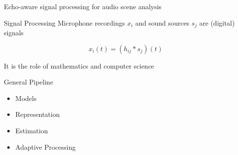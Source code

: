 \documentclass[9pt,dvipsnames]{beamer}
\renewenvironment{block}[1]{\begin{oldblock}{#1}\smallskip}{\end{oldblock}}
\begin{document}
    
    \begin{frame}{Echo-aware \alert{signal processing} for audio scene analysis}
        
        \begin{block}{Signal Processing}
            Microphone recordings $x_i$ and sound sources $s_j$ are (digital) signals
            
            \begin{equation*}
                x_i(t) = (h_{ij} \ast s_j)(t)
            \end{equation*}
            
            It is the role of mathematics and computer science
            
        \end{block}
    
        \begin{block}{General Pipeline}
            \begin{itemize}
                \item Models
                \item Representation
                \item Estimation
                \item Adaptive Processing
            \end{itemize}
        \end{block}
    \end{frame}
    
\end{document}
